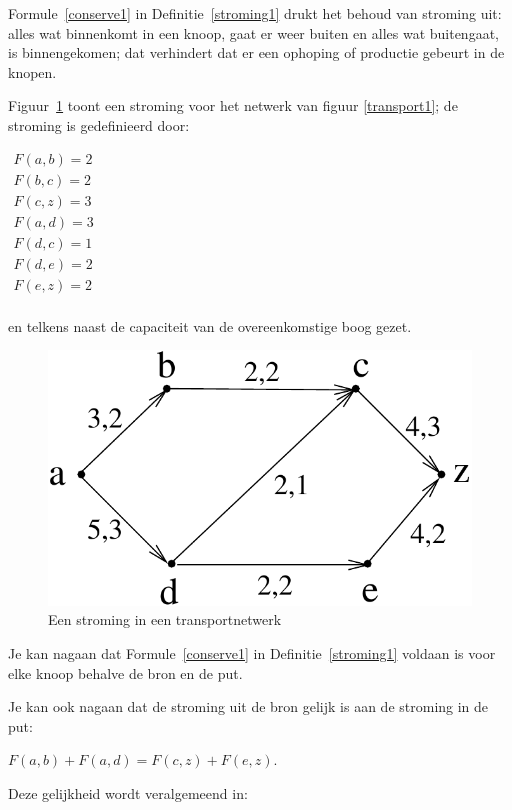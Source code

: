 Formule~\ref{conserve1} in Definitie~\ref{stroming1} drukt het behoud
van stroming uit: alles wat binnenkomt in een knoop, gaat er weer buiten
en alles wat buitengaat, is binnengekomen; dat verhindert dat er een
ophoping of productie gebeurt in de knopen.

Figuur~\ref{stroom2} toont een stroming voor het netwerk van figuur
\ref{transport1}; de stroming is gedefinieerd door:
\begin{center}
$
\begin{array}{l}
F(a,b) = 2\\
F(b,c) = 2\\
F(c,z) = 3\\
F(a,d) = 3\\
F(d,c) = 1\\
F(d,e) = 2\\
F(e,z) = 2\\
\end{array}
$
\end{center}
en telkens naast de capaciteit van de overeenkomstige boog gezet.
\begin{figure}[ht]
\begin{center}
\includegraphics[width=0.3\linewidth,keepaspectratio]{stroom2} %
\end{center}
\caption{Een stroming in een transportnetwerk \label{stroom2}}
\end{figure}

Je kan nagaan dat Formule~\ref{conserve1} in Definitie~\ref{stroming1}
voldaan is voor elke knoop behalve de bron en de put.

Je kan ook nagaan dat de stroming uit de bron gelijk is aan de stroming in
de put:
\begin{center}
\mbox{$F(a,b)+F(a,d) = F(c,z) + F(e,z)$}.
\end{center}
Deze gelijkheid wordt veralgemeend in:

